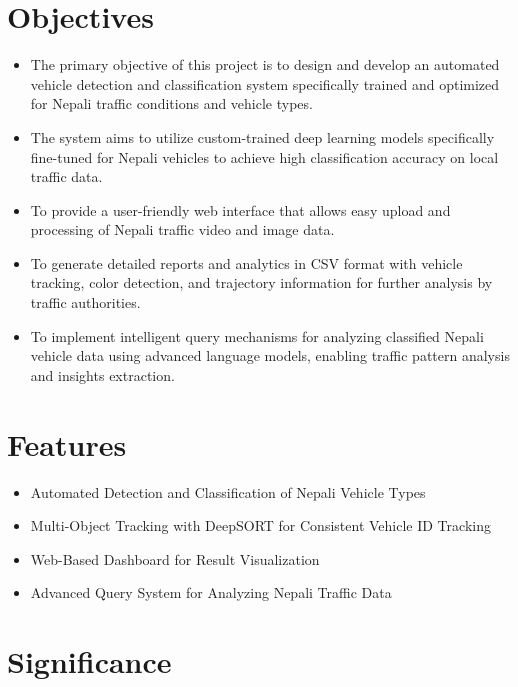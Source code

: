 \documentclass[12pt,a4paper]{report}
\begin{document}
\section{Objectives}

\begin{itemize}
    \item The primary objective of this project is to design and develop an automated vehicle detection and classification system specifically trained and optimized for Nepali traffic conditions and vehicle types.
    
    \item The system aims to utilize custom-trained deep learning models specifically fine-tuned for Nepali vehicles to achieve high classification accuracy on local traffic data.
    
    \item To provide a user-friendly web interface that allows easy upload and processing of Nepali traffic video and image data.
    
    \item To generate detailed reports and analytics in CSV format with vehicle tracking, color detection, and trajectory information for further analysis by traffic authorities.
    
    \item To implement intelligent query mechanisms for analyzing classified Nepali vehicle data using advanced language models, enabling traffic pattern analysis and insights extraction.
\end{itemize}

\section{Features}

\begin{itemize}
    \item Automated Detection and Classification of Nepali Vehicle Types
    \item Multi-Object Tracking with DeepSORT for Consistent Vehicle ID Tracking
    \item Web-Based Dashboard for Result Visualization
    \item Advanced Query System for Analyzing Nepali Traffic Data
\end{itemize}

\section{Significance}
\end{document}
